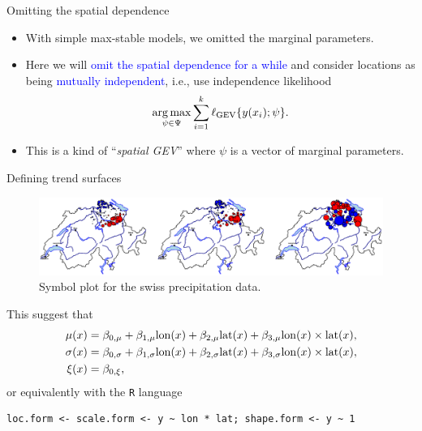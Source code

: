 \documentclass[blackslide,style=simple]{powerdot}
\theoremstyle{plain}%
\theoremstyle{definition}
\theoremstyle{remark}
\begin{document}
\begin{slide}[toc=Spatial GEV]{Omitting the spatial dependence}
  \begin{itemize}
  \item With simple max-stable models, we omitted the marginal parameters.
  \item Here we will \textcolor{blue}{omit the spatial dependence for
      a while} and consider locations as being
    \textcolor{blue}{mutually independent}, i.e., use independence
    likelihood
    \begin{equation*}
      \underset{\psi \in \Psi}{\arg \max} \sum_{i=1}^k \ell_{\rm
        GEV}\{y(x_i); \psi\}.
    \end{equation*}
  \item This is a kind of ``\emph{spatial GEV}'' where $\psi$ is a
    vector of marginal parameters.
  \end{itemize}
\end{slide}

\begin{slide}[toc=,method=direct]{Defining trend surfaces}
  \vspace*{-1em}
  \begin{figure}
    \centering
    \includegraphics[width=\textwidth]{Figures/symbolPlot2}
    \caption{Symbol plot for the swiss precipitation data.}
  \end{figure}
  This suggest that
  \begin{align*}
    \mu(x) &= \beta_{0,\mu} + \beta_{1, \mu} {\rm lon}(x) + \beta_{2,
      \mu} {\rm lat}(x) + \beta_{3, \mu} {\rm lon}(x) \times {\rm lat}(x),\\
    \sigma(x) &= \beta_{0,\sigma} + \beta_{1, \sigma} {\rm lon}(x) + \beta_{2,
      \sigma} {\rm lat}(x) + \beta_{3, \sigma} {\rm lon}(x) \times {\rm lat}(x),\\
    \xi(x) &= \beta_{0,\xi},
  \end{align*}
  or equivalently with the \texttt{R} language
{\tiny
\begin{verbatim}
loc.form <- scale.form <- y ~ lon * lat; shape.form <- y ~ 1
\end{verbatim}
}
\end{slide}
\end{document}

